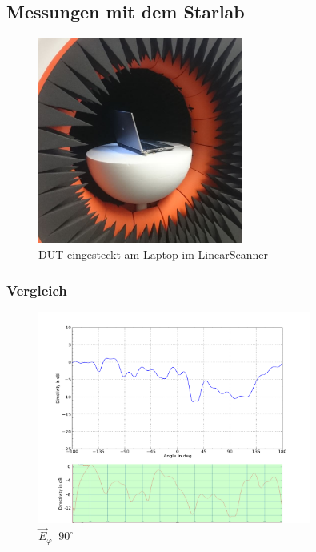 \newpage
\subsection{Messungen mit dem Starlab}

\begin{figure}[h!]
	\centering
	\includegraphics[width=0.6\textwidth]{../fig/plt/LaptopimStarLab.JPG}
	\caption{DUT eingesteckt am Laptop im LinearScanner}
	\label{fig:LaptopimStarlab}
\end{figure}

\subsubsection{Vergleich}

\begin{figure}[h!]
	\centering
	\includegraphics[width=0.8\textwidth]{../fig/plt/comparison_l4_pcb_v2c_laptop_1a_105_etot_phi90_2ghz4.png}
	\caption{$\vec{E}_{\varphi} \;\; 90^\circ$}
	\label{fig:E_tot_90}
\end{figure}

